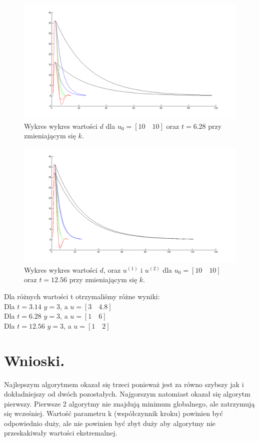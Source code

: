 \documentclass[a4paper,10pt]{article}
\begin{document}
\begin{figure}[!h]
    \centering
	\includegraphics[width=120mm]{CW4-alg3fun2-u10_10-k001_01-t628-d.png}
	\caption{Wykres wykres wartości $d$ dla $u_0=[10 \quad 10]$ oraz $t=6.28$ przy zmieniającym się $k$.}
    \label{fig:Rysunek}
\end{figure}
\begin{figure}[!h]
    \centering
	\includegraphics[width=120mm]{CW4-alg3fun2-u10_10-k001_01-t0-d.png}
	\caption{Wykres wykres wartości $d$, oraz $u^{(1)}$ i $u^{(2)}$ dla $u_0=[10 \quad 10]$ oraz $t=12.56$ przy zmieniającym się $k$.}
    \label{fig:Rysunek}
\end{figure}

\newpage Dla różnych wartości t otrzymaliśmy różne wyniki:\\
Dla $t=3.14$ $y=3$, a $u=[3 \quad 4.8]$\\
Dla $t=6.28$ $y=3$, a $u=[1 \quad 6]$\\
Dla $t=12.56$ $y=3$, a $u=[1 \quad 2]$


\section{Wnioski.}\label{sec:wnioski}
Najlepszym algorytmem okazał się trzeci ponieważ jest za równo szybszy jak i dokładniejszy od dwóch pozostałych. Najgorszym natomiast okazał się algorytm pierwszy. Pierwsze 2 algorytmy nie znajdują minimum globalnego, ale zatrzymują się wcześniej. Wartość parametru k (współczynnik kroku) powinien być odpowiednio duży, ale nie powinien być zbyt duży aby algorytmy nie przeskakiwały wartości ekstremalnej.
\end{document}
